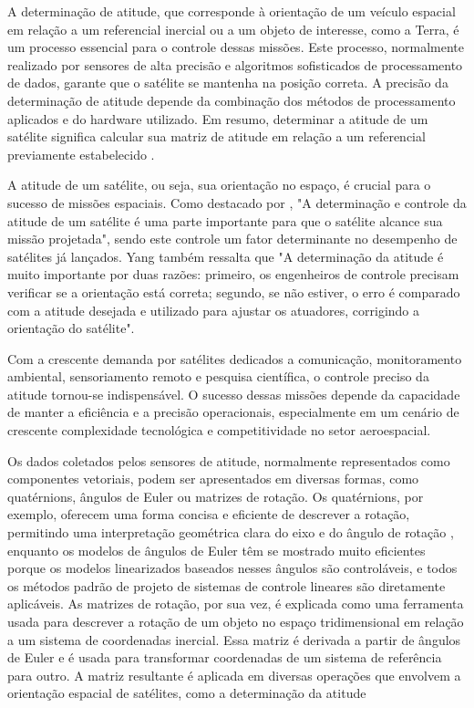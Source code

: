 \documentclass[
	12pt,				%
	openright,			%
	oneside,			%
	a4paper,			%
	english,			%
	brazil				%
	]{abntex2}
\begin{document}
A determinação de atitude, que corresponde à orientação de um veículo espacial em relação a um referencial inercial ou a um objeto de interesse, como a Terra, é um processo essencial para o controle dessas missões. Este processo, normalmente realizado por sensores de alta precisão e algoritmos sofisticados de processamento de dados, garante que o satélite se mantenha na posição correta. A precisão da determinação de atitude depende da combinação dos métodos de processamento aplicados e do hardware utilizado. Em resumo, determinar a atitude de um satélite significa calcular sua matriz de atitude em relação a um referencial previamente estabelecido \cite{Wertz2012}.

A atitude de um satélite, ou seja, sua orientação no espaço, é crucial para o sucesso de missões espaciais. Como destacado por \cite{YANG2012198}, "A determinação e controle da atitude de um satélite é uma parte importante para que o satélite alcance sua missão projetada", sendo este controle um fator determinante no desempenho de satélites já lançados. Yang também ressalta que "A determinação da atitude é muito importante por duas razões: primeiro, os engenheiros de controle precisam verificar se a orientação está correta; segundo, se não estiver, o erro é comparado com a atitude desejada e utilizado para ajustar os atuadores, corrigindo a orientação do satélite".

Com a crescente demanda por satélites dedicados a comunicação, monitoramento ambiental, sensoriamento remoto e pesquisa científica, o controle preciso da atitude tornou-se indispensável. O sucesso dessas missões depende da capacidade de manter a eficiência e a precisão operacionais, especialmente em um cenário de crescente complexidade tecnológica e competitividade no setor aeroespacial.

Os dados coletados pelos sensores de atitude, normalmente representados como componentes vetoriais, podem ser apresentados em diversas formas, como quatérnions, ângulos de Euler ou matrizes de rotação. Os quatérnions, por exemplo, oferecem uma forma concisa e eficiente de descrever a rotação, permitindo uma interpretação geométrica clara do eixo e do ângulo de rotação \cite{jia2013quaternions}, enquanto os modelos de ângulos de Euler têm se mostrado muito eficientes porque os modelos linearizados baseados nesses ângulos são controláveis, e todos os métodos padrão de projeto de sistemas de controle lineares são diretamente aplicáveis\cite{YANG2012198}. As matrizes de rotação, por sua vez, é explicada como uma ferramenta usada para descrever a rotação de um objeto no espaço tridimensional em relação a um sistema de coordenadas inercial. Essa matriz é derivada a partir de ângulos de Euler e é usada para transformar coordenadas de um sistema de referência para outro. A matriz resultante é aplicada em diversas operações que envolvem a orientação espacial de satélites, como a determinação da atitude \cite{silva2016}
\end{document}
